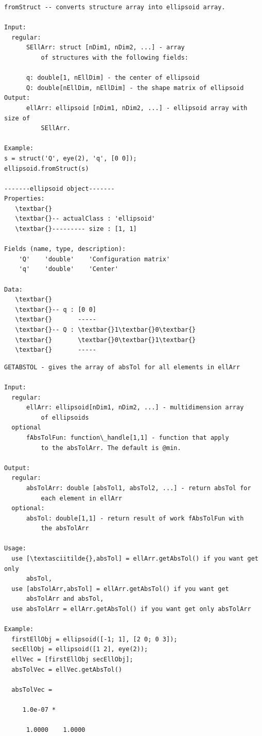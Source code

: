 \documentclass[letterpaper,10pt,english]{sphinxmanual}
\begin{document}
\begin{Verbatim}[commandchars=\\\{\}]
fromStruct -- converts structure array into ellipsoid array.

Input:
  regular:
      SEllArr: struct [nDim1, nDim2, ...] - array
          of structures with the following fields:

      q: double[1, nEllDim] - the center of ellipsoid
      Q: double[nEllDim, nEllDim] - the shape matrix of ellipsoid
Output:
      ellArr: ellipsoid [nDim1, nDim2, ...] - ellipsoid array with size of
          SEllArr.

Example:
s = struct('Q', eye(2), 'q', [0 0]);
ellipsoid.fromStruct(s)

-------ellipsoid object-------
Properties:
   \textbar{}
   \textbar{}-- actualClass : 'ellipsoid'
   \textbar{}--------- size : [1, 1]

Fields (name, type, description):
    'Q'    'double'    'Configuration matrix'
    'q'    'double'    'Center'

Data:
   \textbar{}
   \textbar{}-- q : [0 0]
   \textbar{}       -----
   \textbar{}-- Q : \textbar{}1\textbar{}0\textbar{}
   \textbar{}       \textbar{}0\textbar{}1\textbar{}
   \textbar{}       -----
\end{Verbatim}

\begin{Verbatim}[commandchars=\\\{\}]
GETABSTOL - gives the array of absTol for all elements in ellArr

Input:
  regular:
      ellArr: ellipsoid[nDim1, nDim2, ...] - multidimension array
          of ellipsoids
  optional
      fAbsTolFun: function\_handle[1,1] - function that apply
          to the absTolArr. The default is @min.

Output:
  regular:
      absTolArr: double [absTol1, absTol2, ...] - return absTol for
          each element in ellArr
  optional:
      absTol: double[1,1] - return result of work fAbsTolFun with
          the absTolArr

Usage:
  use [\textasciitilde{},absTol] = ellArr.getAbsTol() if you want get only
      absTol,
  use [absTolArr,absTol] = ellArr.getAbsTol() if you want get
      absTolArr and absTol,
  use absTolArr = ellArr.getAbsTol() if you want get only absTolArr

Example:
  firstEllObj = ellipsoid([-1; 1], [2 0; 0 3]);
  secEllObj = ellipsoid([1 2], eye(2));
  ellVec = [firstEllObj secEllObj];
  absTolVec = ellVec.getAbsTol()

  absTolVec =

     1.0e-07 *

      1.0000    1.0000
\end{Verbatim}
\end{document}
